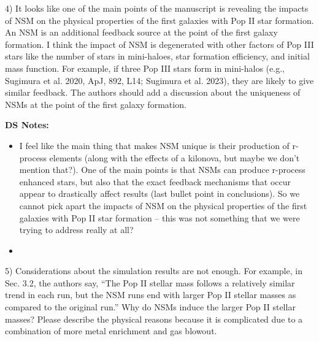 \documentclass[11pt]{article}
\begin{document}
\begin{tcolorbox}[colback={lightgray}]
    4)      It looks like one of the main points of the manuscript is revealing the impacts of NSM on the physical properties of the first galaxies with Pop II star formation. An NSM is an additional feedback source at the point of the first galaxy formation. I think the impact of NSM is degenerated with other factors of Pop III stars like the number of stars in mini-haloes, star formation efficiency, and initial mass function. For example, if three Pop III stars form in mini-halos (e.g., Sugimura et al. 2020, ApJ, 892, L14; Sugimura et al. 2023), they are likely to give similar feedback. The authors should add a discussion about the uniqueness of NSMs at the point of the first galaxy formation.
\end{tcolorbox}

\textbf{DS Notes:}
\begin{itemize}
    \item I feel like the main thing that makes NSM unique is their production of r-process elements (along with the effects of a kilonova, but maybe we don't mention that?). One of the main points is that NSMs can produce r-process enhanced stars, but also that the exact feedback mechanisms that occur appear to drastically affect results (last bullet point in conclusions). So we cannot pick apart the impacts of NSM on the physical properties of the first galaxies with Pop II star formation -- this was not something that we were trying to address really at all?
    \item {}
\end{itemize}

\begin{tcolorbox}[colback={lightgray}] 
    5)      Considerations about the simulation results are not enough. For example, in Sec. 3.2, the authors say, “The Pop II stellar mass follows a relatively similar trend in each run, but the NSM runs end with larger Pop II stellar masses as compared to the original run.” Why do NSMs induce the larger Pop II stellar masses? Please describe the physical reasons because it is complicated due to a combination of more metal enrichment and gas blowout.
\end{tcolorbox}
\end{document}
